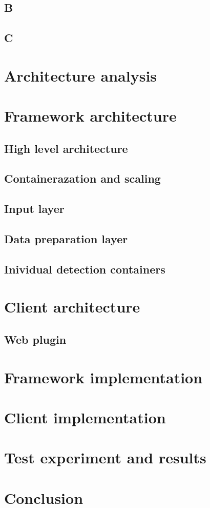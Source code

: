 \section{B}
\section{C}

\chapter{Architecture analysis}


\chapter{Framework architecture}
\section{High level architecture}
\section{Containerazation and scaling}
\section{Input layer}
\section{Data preparation layer}
\section{Inividual detection containers}

\chapter{Client architecture}
\section{Web plugin}

\chapter{Framework implementation}

\chapter{Client implementation}

\chapter{Test experiment and results}

\chapter{Conclusion}